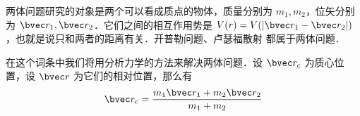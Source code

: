 

两体问题研究的对象是两个可以看成质点的物体，质量分别为 $m_1,m_2$，位矢分别为 $\bvec r_1,\bvec r_2$．它们之间的相互作用势是 $V(r)=V(|\bvec r_1-\bvec r_2|)$，也就是说只和两者的距离有关．开普勒问题、卢瑟福散射 都属于两体问题．

在这个词条中我们将用分析力学的方法来解决两体问题．设 $\bvec r_c$ 为质心位置，设 $\bvec r$ 为它们的相对位置，那么有
\begin{equation}
\bvec r_c=\frac{m_1\bvec r_1+ m_2\bvec r_2}{m_1+m_2}
\end{equation}
